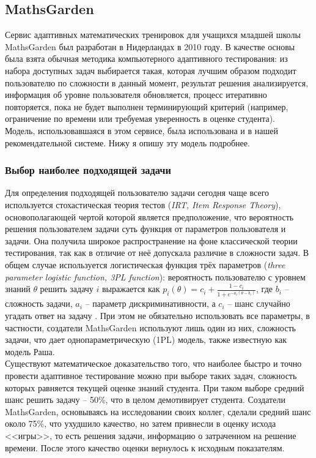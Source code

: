 \documentclass[14pt]{matmex-diploma}
\begin{document}
\subsection{MathsGarden}
\indent Сервис адаптивных математических тренировок для учащихся младшей школы MathsGarden\cite{mathsgarden} был разработан в Нидерландах в 2010 году. В качестве основы была взята обычная методика компьютерного адаптивного тестирования: из набора доступных задач выбирается такая, которая лучшим образом подходит пользователю по сложности в данный момент, результат решения анализируется, информация об уровне пользователя обновляется, процесс итеративно повторяется, пока не будет выполнен терминирующий критерий (например, ограничение по времени или требуемая уверенность в оценке студента). 
\\\indent Модель, использовавшаяся в этом сервисе, была использована и в нашей рекомендательной системе. Нижу я опишу эту модель подробнее.
\subsubsection{Выбор наиболее подходящей задачи}
\indent Для определения подходящей пользователю задачи сегодня чаще всего используется стохастическая теория тестов (\textit{IRT, Item Response Theory})\cite{CAT}, основополагающей чертой которой является предположение, что вероятность решения пользователем задачи суть функция от параметров пользователя и задачи. Она получила широкое распространение на фоне классической теории тестирования, так как в отличие от неё допускала различие в сложности задач. В общем случае используется логистическая функция трёх параметров (\textit{three parameter logistic function, 3PL function}): вероятность пользователю с уровнем знаний $\theta$ решить задачу $i$ выражается как $p_i(\theta) = c_i + \frac{1 - c_i}{1 + e^{-a_i(\theta - b_i)}}$, где $b_i$ -- сложность задачи, $a_i$ -- параметр дискриминативности, а $c_i$ -- шанс случайно угадать ответ на задачу \cite{IRTapplications}. При этом не обязательно использовать все параметры, в частности, создатели MathsGarden используют лишь один из них, сложность задачи, что дает однопараметрическую (1PL) модель, также известную как модель Раша\cite{rasch_model}.
\\\indent Существуют математическое доказательство того, что наиболее быстро и точно провести адаптивное тестирование можно при выборе таких задач, сложность которых равняется текущей оценке знаний студента. При таком выборе средний шанс решить задачу -- 50\%, что в целом демотивирует студента\cite{ericsson2006influence}. Создатели MathsGarden, основываясь на исследовании своих коллег\cite{time_scoring_rules}, сделали средний шанс около 75\%, что ухудшило качество, но затем привнесли в оценку исхода <<игры>>, то есть решения задачи, информацию о затраченном на решение времени. После этого качество оценки вернулось к исходным показателям\cite{mathsgarden}.
\end{document}
